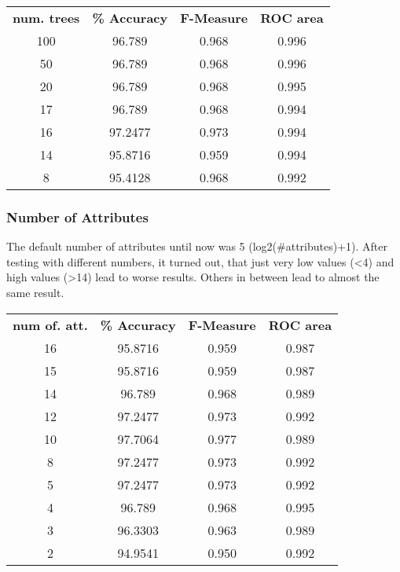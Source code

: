 \documentclass{article}
\begin{document}
\begin{center}
\begin{tabular}{ c | c | c | c }
\textbf{num. trees} & \textbf{\% Accuracy} & \textbf{F-Measure} & \textbf{ROC area} \\
100 & 96.789 & 0.968 & 0.996 \\
50 & 96.789 & 0.968 &  0.996 \\
20 & 96.789 & 0.968 & 0.995 \\
17 & 96.789 & 0.968 & 0.994 \\
16 & 97.2477 & 0.973 & 0.994 \\
14 & 95.8716 & 0.959 & 0.994 \\
8 & 95.4128 & 0.968 & 0.992 \\
\end{tabular}
\end{center}
 
\subsubsection{Number of Attributes}
 
The default number of attributes until now was 5 (log2(\#attributes)+1). After testing with different numbers, it turned out, that just very low values (\textless4) and high values (\textgreater14) lead to worse results. Others in between lead to almost the same result.
 
\begin{center}
\begin{tabular}{ c | c | c | c }
\textbf{num of. att.} & \textbf{\% Accuracy} & \textbf{F-Measure} & \textbf{ROC area}\\
16 & 95.8716 & 0.959 & 0.987  \\
15 & 95.8716 & 0.959 & 0.987 \\
14 & 96.789 &  0.968 & 0.989 \\
12 & 97.2477 & 0.973 & 0.992 \\
10 & 97.7064 & 0.977 & 0.989 \\
8 & 97.2477 & 0.973 & 0.992 \\
5 & 97.2477 & 0.973 & 0.992 \\
4 & 96.789 & 0.968 & 0.995 \\
3 & 96.3303 & 0.963 & 0.989 \\
2 & 94.9541 & 0.950 & 0.992 \\
\end{tabular}
\end{center} 
\end{document}

